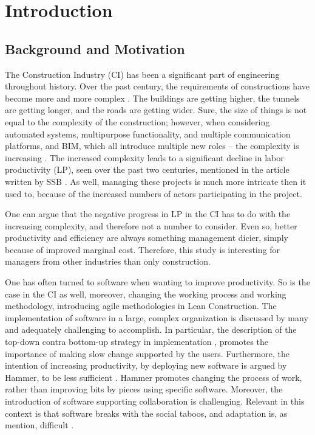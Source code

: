 \chapter{Introduction}

\section{Background and Motivation} \label{sec:background}
The Construction Industry (CI) has been a significant part of engineering throughout history. Over the past century, the requirements of constructions have become more and more complex \cite{wood2009factors}. The buildings are getting higher, the tunnels are getting longer, and the roads are getting wider. Sure, the size of things is not equal to the complexity of the construction; however, when considering automated systems, multipurpose functionality, and multiple communication platforms, and BIM, which all introduce multiple new roles – the complexity is increasing \cite{arayici2010building}. The increased complexity leads to a significant decline in labor productivity (LP), seen over the past two centuries, mentioned in the article written by SSB \cite{productivity}. As well, managing these projects is much more intricate then it used to, because of the increased numbers of actors participating in the project.  
 
One can argue that the negative progress in LP in the CI has to do with the increasing complexity, and therefore not a number to consider. Even so, better productivity and efficiency are always something management dicier, simply because of improved marginal cost. Therefore, this study is interesting for managers from other industries than only construction.
 
One has often turned to software when wanting to improve productivity. So is the case in the CI as well, moreover, changing the working process and working methodology, introducing agile methodologies in Lean Construction. The implementation of software in a large, complex organization is discussed by many and adequately challenging to accomplish. In particular, the description of the top-down contra bottom-up strategy in implementation \cite{Robey&Sahay}, promotes the importance of making slow change supported by the users. Furthermore, the intention of increasing productivity, by deploying new software is argued by Hammer, to be less sufficient \cite{hammer1990reengineering}. Hammer promotes changing the process of work, rather than improving bits by pieces using specific software. Moreover, the introduction of software supporting collaboration is challenging. Relevant in this context is that software breaks with the social taboos, and adaptation is, as mention, difficult \cite{Grudin}. 
 
